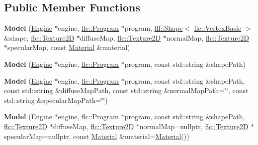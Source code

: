 \subsection*{Public Member Functions}
\begin{DoxyCompactItemize}
\item 
\mbox{\label{classflw_1_1flf_1_1Model_aa83f3e9cc7f2d49ee34f9dcdd208654d}} 
{\bfseries Model} (\hyperlink{classflw_1_1Engine}{Engine} $\ast$engine, \hyperlink{classflw_1_1flc_1_1Program}{flc\+::\+Program} $\ast$program, \hyperlink{classflw_1_1flf_1_1Shape}{flf\+::\+Shape}$<$ \hyperlink{structflw_1_1flc_1_1VertexBasic}{flc\+::\+Vertex\+Basic} $>$ \&shape, \hyperlink{classflw_1_1flc_1_1Texture2D}{flc\+::\+Texture2D} $\ast$diffuse\+Map, \hyperlink{classflw_1_1flc_1_1Texture2D}{flc\+::\+Texture2D} $\ast$normal\+Map, \hyperlink{classflw_1_1flc_1_1Texture2D}{flc\+::\+Texture2D} $\ast$specular\+Map, const \hyperlink{classflw_1_1flf_1_1Material}{Material} \&material)
\item 
\mbox{\label{classflw_1_1flf_1_1Model_ab57e72496bcae774f307b00a685299a9}} 
{\bfseries Model} (\hyperlink{classflw_1_1Engine}{Engine} $\ast$engine, \hyperlink{classflw_1_1flc_1_1Program}{flc\+::\+Program} $\ast$program, const std\+::string \&shape\+Path)
\item 
\mbox{\label{classflw_1_1flf_1_1Model_abdb7f7c5d0f3f9ac4027578a52083c3f}} 
{\bfseries Model} (\hyperlink{classflw_1_1Engine}{Engine} $\ast$engine, \hyperlink{classflw_1_1flc_1_1Program}{flc\+::\+Program} $\ast$program, const std\+::string \&shape\+Path, const std\+::string \&diffuse\+Map\+Path, const std\+::string \&normal\+Map\+Path=\char`\"{}\char`\"{}, const std\+::string \&specular\+Map\+Path=\char`\"{}\char`\"{})
\item 
\mbox{\label{classflw_1_1flf_1_1Model_a9cb521f1f149a4ad58933bad3430d9b5}} 
{\bfseries Model} (\hyperlink{classflw_1_1Engine}{Engine} $\ast$engine, \hyperlink{classflw_1_1flc_1_1Program}{flc\+::\+Program} $\ast$program, const std\+::string \&shape\+Path, \hyperlink{classflw_1_1flc_1_1Texture2D}{flc\+::\+Texture2D} $\ast$diffuse\+Map, \hyperlink{classflw_1_1flc_1_1Texture2D}{flc\+::\+Texture2D} $\ast$normal\+Map=nullptr, \hyperlink{classflw_1_1flc_1_1Texture2D}{flc\+::\+Texture2D} $\ast$specular\+Map=nullptr, const \hyperlink{classflw_1_1flf_1_1Material}{Material} \&material=\hyperlink{classflw_1_1flf_1_1Material}{Material}())

\end{DoxyCompactItemize}

